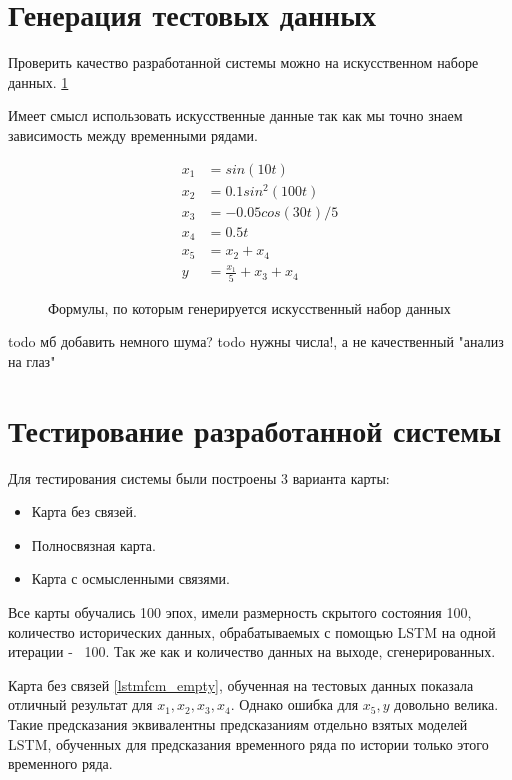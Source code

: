 \section{Генерация тестовых данных}

Проверить качество разработанной системы можно на искусственном наборе
данных. \ref{pic:example_data_formulas}

Имеет смысл использовать искусственные данные так как мы точно знаем
зависимость между временными рядами.

\def\figurename{Формулы}
\begin{figure}[t]
	\begin{center}
	\begin{align*}
		x_1 &= sin(10t) \\
		x_2 &= 0.1 sin^2(100t) \\
		x_3 &= -0.05 cos(30t)/5 \\
		x_4 &= 0.5 t \\
		x_5 &= x_2 + x_4\\
		y   &= \frac{x_1}{5} + x_3 + x_4
	\end{align*}
	\end{center}
	\caption{Формулы, по которым генерируется искусственный набор данных}
	\label{pic:example_data_formulas}
\end{figure}
\noindent

todo мб добавить немного шума?
todo нужны числа!, а не качественный "анализ на глаз"

\section{Тестирование разработанной системы}

Для тестирования системы были построены 3 варианта карты:
\begin{itemize}
	\item Карта без связей.
	\item Полносвязная карта.
	\item Карта с осмысленными связями.
\end{itemize}

Все карты обучались 100 эпох, имели размерность скрытого состояния 100,
количество исторических данных, обрабатываемых с помощью LSTM на одной итерации -~ 100.
Так же как и количество данных на выходе, сгенерированных.


Карта без связей \ref{lstmfcm_empty}, обученная на тестовых данных
показала отличный результат для $ x_1, x_2, x_3, x_4  $. Однако ошибка
для $ x_5, y $ довольно велика. Такие предсказания эквивалентны предсказаниям
отдельно взятых моделей LSTM, обученных для предсказания временного ряда
по истории только этого временного ряда.

